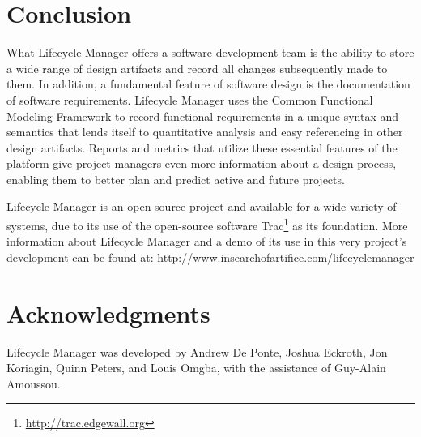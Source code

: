 \documentclass[letterpaper,10pt]{article}
\begin{document}
	\section{Conclusion}
        \label{sec:conclusion}

        What Lifecycle Manager offers a software development team is
        the ability to store a wide range of design artifacts and
        record all changes subsequently made to them. In addition, a
        fundamental feature of software design is the documentation of
        software requirements. Lifecycle Manager uses the Common
        Functional Modeling Framework to record functional
        requirements in a unique syntax and semantics that lends
        itself to quantitative analysis and easy referencing in other
        design artifacts. Reports and metrics that utilize these
        essential features of the platform give project managers even
        more information about a design process, enabling them to
        better plan and predict active and future projects.

        Lifecycle Manager is an open-source project and available for
        a wide variety of systems, due to its use of the open-source
        software Trac\footnote{\url{http://trac.edgewall.org}} as its
        foundation. More information about Lifecycle Manager and a
        demo of its use in this very project's development can be
        found at:
        \url{http://www.insearchofartifice.com/lifecyclemanager}
	
	\section{Acknowledgments}

        Lifecycle Manager was developed by Andrew De Ponte, Joshua
        Eckroth, Jon Koriagin, Quinn Peters, and Louis Omgba, with the
        assistance of Guy-Alain Amoussou.

	
\end{document}
